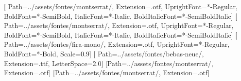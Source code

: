 %

\newcommand{\raizcapacitacao}{..}
\newcommand{\imagens}{\raizcapacitacao/assets/imagens}
\newcommand{\fontes}{\raizcapacitacao/assets/fontes}

\usepackage{xcolor}
\usepackage{graphicx}

\usepackage{fontspec}
\setmainfont{Montserrat}[
  Path=\fontes/montserrat/, Extension=.otf,
  UprightFont=*-Regular, BoldFont=*-SemiBold,
  ItalicFont=*-Italic, BoldItalicFont=*-SemiBoldItalic]
\setsansfont{Montserrat}[
  Path=\fontes/montserrat/, Extension=.otf,
  UprightFont=*-Regular, BoldFont=*-SemiBold,
  ItalicFont=*-Italic, BoldItalicFont=*-SemiBoldItalic]
\setmonofont{FiraMono}[
  Path=\fontes/fira-mono/, Extension=.otf,
  UprightFont=*-Regular, BoldFont=*-Bold, Scale=0.9]
\newfontfamily{}[
  Path=\fontes/bebas-neue/, Extension=.ttf, LetterSpace=2.0]
\newfontfamily{}[Path=\fontes/montserrat/, Extension=.otf]
\newfontfamily{}[Path=\fontes/montserrat/, Extension=.otf]

